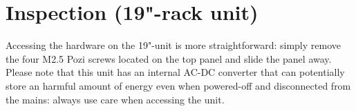 \section{Inspection (19"-rack unit)}
Accessing the hardware on the 19"-unit is more straightforward: simply remove the four M2.5 Pozi screws located on the top panel and slide the panel away. Please note that this unit has an internal AC-DC converter that can potentially store an harmful amount of energy even when powered-off and disconnected from the mains: always use care when accessing the unit. 
%
%
%
